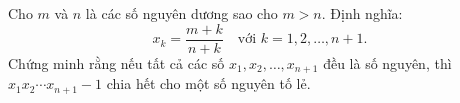 \ifshowproblem
\begin{problem}\label{example:IMO-2015-SL-P3}
    Cho \( m \) và \( n \) là các số nguyên dương sao cho \( m > n \). Định nghĩa:
    \[
        x_k = \frac{m + k}{n + k} \quad \text{với } k = 1, 2, \ldots, n + 1.
    \]
    Chứng minh rằng nếu tất cả các số \( x_1, x_2, \ldots, x_{n+1} \) đều là số nguyên,
    thì \( x_1 x_2 \cdots x_{n+1} - 1 \) chia hết cho một số nguyên tố lẻ.    
\end{problem}
\fi

\footnotemark
{}
\fi
